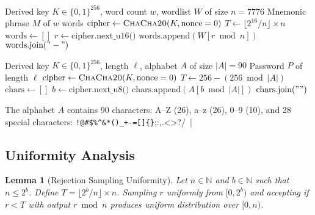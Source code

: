 \documentclass[11pt]{article}
\newtheorem{lemma}[theorem]{Lemma}
\begin{document}
\begin{algorithm}
\caption{Mnemonic generation via rejection sampling}
\label{alg:mnemonic}
\begin{algorithmic}[1]
\Require Derived key $K \in \{0,1\}^{256}$, word count $w$, wordlist $W$ of size $n = 7776$
\Ensure Mnemonic phrase $M$ of $w$ words
\State $\text{cipher} \gets \textsc{ChaCha20}(K, \text{nonce}=0)$
\State $T \gets \lfloor 2^{16} / n \rfloor \times n$ 
\State $\text{words} \gets []$
    \State $r \gets \text{cipher.next\_u16()}$ 
        \State $\text{words.append}(W[r \bmod n])$
    \EndIf
\EndWhile
\State \Return $\text{words.join}("-")$
\end{algorithmic}
\end{algorithm}

\begin{algorithm}
\caption{Password generation via rejection sampling}
\label{alg:password}
\begin{algorithmic}[1]
\Require Derived key $K \in \{0,1\}^{256}$, length $\ell$, alphabet $A$ of size $|A| = 90$
\Ensure Password $P$ of length $\ell$
\State $\text{cipher} \gets \textsc{ChaCha20}(K, \text{nonce}=0)$
\State $T \gets 256 - (256 \bmod |A|)$ 
\State $\text{chars} \gets []$
    \State $b \gets \text{cipher.next\_u8()}$ 
        \State $\text{chars.append}(A[b \bmod |A|])$
    \EndIf
\EndWhile
\State \Return $\text{chars.join}("")$
\end{algorithmic}
\end{algorithm}

The alphabet $A$ contains 90 characters: A--Z (26), a--z (26), 0--9 (10), and 28 special characters: \verb|!@#$%^&*()_+-=[]{}|;:,.<>?/~|

\subsection{Uniformity Analysis}

\begin{lemma}[Rejection Sampling Uniformity]
\label{lem:uniform}
Let $n \in \mathbb{N}$ and $b \in \mathbb{N}$ such that $n \leq 2^b$. Define $T = \lfloor 2^b / n \rfloor \times n$. Sampling $r$ uniformly from $[0, 2^b)$ and accepting if $r < T$ with output $r \bmod n$ produces uniform distribution over $[0, n)$.
\end{lemma}
\end{document}
